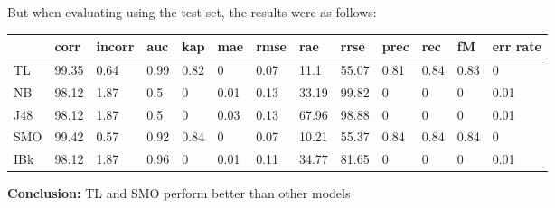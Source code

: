 \documentclass[a4paper,12pt, english]{article}
\begin{document}
But when evaluating using the test set, the results were as follows:
\begin{small}
\begin{center}
    \begin{tabular}{ | l | l | l | l | l | l | l | l | l | l | l | l | l |}
    \hline
      	& corr & incorr  & auc & kap & mae & rmse & rae & rrse & prec & rec & fM & err rate\\ \hline
      	TL & 99.35 & 0.64 & 0.99 & 0.82 & 0 & 0.07 & 11.1 & 55.07 & 0.81 & 0.84 & 0.83 & 0\\ \hline
	NB & 98.12 & 1.87 & 0.5 & 0 & 0.01 & 0.13 & 33.19 & 99.82 & 0 & 0 & 0 & 0.01\\ \hline
	J48 & 98.12 & 1.87 & 0.5 & 0 & 0.03 & 0.13 & 67.96 & 98.88 & 0 & 0 & 0 & 0.01\\ \hline
	SMO & 99.42 & 0.57 & 0.92 & 0.84 & 0 & 0.07 & 10.21 & 55.37 & 0.84 & 0.84 & 0.84 & 0\\ \hline
	IBk & 98.12 & 1.87 & 0.96 & 0 & 0.01 & 0.11 & 34.77 & 81.65 & 0 & 0 & 0 & 0.01\\ \hline  
    \end{tabular}       
\end{center}
\end{small}
\textbf{Conclusion:} TL and SMO perform better than other models

\newpage
\end{document}
